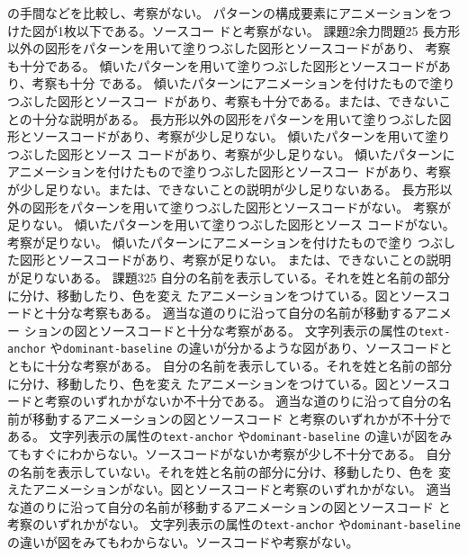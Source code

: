 \documentclass[a4j]{jreport}
\begin{document}
{{{の手間などを比較し、考察がない。}
	{パターンの構成要素にアニメーションをつけた図が1枚以下である。ソースコー
ドと考察がない。}
	}
	{課題2余力問題}{25}
	{
	{長方形以外の図形をパターンを用いて塗りつぶした図形とソースコードがあり、
考察も十分である。}
	{傾いたパターンを用いて塗りつぶした図形とソースコードがあり、考察も十分
である。}
	{傾いたパターンにアニメーションを付けたもので塗りつぶした図形とソースコー
ドがあり、考察も十分である。または、できないことの十分な説明がある。}
	}
	{
	{長方形以外の図形をパターンを用いて塗りつぶした図
形とソースコードがあり、考察が少し足りない。}
	{傾いたパターンを用いて塗りつぶした図形とソース
コードがあり、考察が少し足りない。}
	{傾いたパターンにアニメーションを付けたもので塗りつぶした図形とソースコー
ドがあり、考察が少し足りない。または、できないことの説明が少し足りないある。}
	}
	{
	{長方形以外の図形をパターンを用いて塗りつぶした図形とソースコードがない。
考察が足りない。}
	{傾いたパターンを用いて塗りつぶした図形とソース
コードがない。考察が足りない。}
	{傾いたパターンにアニメーションを付けたもので塗り
つぶした図形とソースコードがあり、考察が足りない。
または、できないことの説明が足りないある。}
	}
	{課題3}{25}
	{
	{自分の名前を表示している。それを姓と名前の部分に分け、移動したり、色を変え
たアニメーションをつけている。図とソースコードと十分な考察もある。}
	{適当な道のりに沿って自分の名前が移動するアニメー
ションの図とソースコードと十分な考察がある。}
	{文字列表示の属性の\texttt{text-anchor} や\texttt{dominant-baseline}
の違いが分かるような図があり、ソースコードとともに十分な考察がある。}
	}
	{
	{自分の名前を表示している。それを姓と名前の部分に分け、移動したり、色を変え
たアニメーションをつけている。図とソースコードと考察のいずれかがないか不十分である。}
	{適当な道のりに沿って自分の名前が移動するアニメーションの図とソースコード
と考察のいずれかが不十分である。}
	{文字列表示の属性の\texttt{text-anchor} や\texttt{dominant-baseline}
の違いが図をみてもすぐにわからない。ソースコードがないか考察が少し不十分である。}
	}
	{
	{自分の名前を表示していない。それを姓と名前の部分に分け、移動したり、色を
変えたアニメーションがない。図とソースコードと考察のいずれかがない。}
	{適当な道のりに沿って自分の名前が移動するアニメーションの図とソースコード
と考察のいずれかがない。}
	{文字列表示の属性の\texttt{text-anchor} や\texttt{dominant-baseline}
の違いが図をみてもわからない。ソースコードや考察がない。}
	}
}
\end{document}
